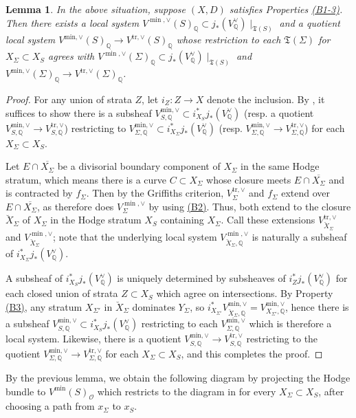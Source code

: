 \documentclass{amsart}
\newcommand{\customref}[2]{\hyperref[#1]{#2}}
\newtheorem{lem}[theorem]{Lemma}
\theoremstyle{definition}
\theoremstyle{remark}
\def\bQ{\mathbb{Q}}
\def\cO{\mathcal{O}}
\def\trans{\mathrm{tr}}
\numberwithin{equation}{section}
\begin{document}
\begin{lem}\label{lem:glueingalongHodge} In the above situation, suppose $(X,D)$ satisfies Properties \customref{b1}{(B1-3)}. Then there exists a local system $V^{\min,\vee}(S)_\bQ\subset j_*(V^\vee_\bQ)\mid_{\mathfrak{T}(S)}$ and a quotient local system $V^{\mathrm{min},\vee}(S)_\bQ\to V^{\trans,\vee}(S)_\bQ$ whose restriction to each $\mathfrak{T}(\Sigma)$ for $X_\Sigma\subset X_S$ agrees with $V^{\min,\vee}(\Sigma)_{\bQ}\subset j_*(V^\vee_\bQ)\mid_{\mathfrak{T}(S)}$ and $V^{\mathrm{min},\vee}(\Sigma)_\bQ\to V^{\trans,\vee}(\Sigma)_\bQ$.

\end{lem}

\begin{proof}For any union of strata $Z$, let $i_Z:Z\to X$ denote the inclusion.  By , it suffices to show there is a subsheaf $V_{S,\bQ}^{\mathrm{min},\vee}\subset i^*_{X_S}j_*(V_\bQ^\vee)$ (resp. a quotient $V_{S,\bQ}^{\mathrm{min},\vee}\to V_{S,\bQ}^{\trans,\vee}$) restricting to $V_{\Sigma,\bQ}^{\mathrm{min},\vee}\subset i^*_{X_\Sigma}j_*(V_\bQ^\vee)$ (resp. $V_{\Sigma,\bQ}^{\mathrm{min},\vee}\to V_{\Sigma,\bQ}^{\trans,\vee}$) for each $X_\Sigma\subset X_S$.  


Let $E\cap \overline{X_\Sigma}$ be a divisorial boundary component of $X_\Sigma$ in the same Hodge stratum, which means there is a curve $C\subset X_\Sigma$ whose closure meets $E\cap \overline{X_\Sigma}$ and is contracted by $f_\Sigma$. Then by the Griffiths criterion, $V_\Sigma^{\trans,\vee}$ and $f_\Sigma$ extend over $E\cap \overline{X_\Sigma}$, as therefore does $V_\Sigma^{\min,\vee}$ by  using \customref{b2}{(B2)}. Thus, both extend to the closure $\breve X_\Sigma$ of $X_\Sigma$ in the Hodge stratum $X_S$ containing $X_\Sigma$.  Call these extensions $ V^{\trans,\vee}_{\breve X_\Sigma}$ and $ V^{\min,\vee}_{\breve X_\Sigma}$; note that the underlying local system $ V^{\min,\vee}_{\breve X_\Sigma,\bQ}$ is naturally a subsheaf of $i^*_{X_\Sigma}j_*(V^\vee_\bQ)$.

A subsheaf of $i_{X_S}^*j_*(V^\vee_\bQ)$ is uniquely determined by subsheaves of $i_Z^*j_*(V^\vee_\bQ)$ for each closed union of strata $Z\subset X_S$ which agree on intersections.  By Property \customref{b3}{(B3)}, any stratum $X_{\Sigma'}$ in $\breve X_\Sigma$ dominates $Y_\Sigma$, so $i^*_{X_{\Sigma'}}V_{\breve X_\Sigma,\bQ}^{\mathrm{min},\vee}=V_{X_{\Sigma'},\bQ}^{\mathrm{min},\vee}$, hence there is a subsheaf $V_{S,\bQ}^{\mathrm{min},\vee}\subset i_{X_S}^*j_*(V^\vee_\bQ)$ restricting to each $V_{\Sigma,\bQ}^{\mathrm{min},\vee}$ which is therefore a local system.  Likewise, there is a quotient $V_{S,\bQ}^{\mathrm{min},\vee}\to V_{S,\bQ}^{\trans,\vee}$ restricting to the quotient $V_{\Sigma,\bQ}^{\mathrm{min},\vee}\to V_{\Sigma,\bQ}^{\trans,\vee}$ for each $X_\Sigma\subset X_S$, and this completes the proof.
\end{proof}
By the previous lemma, we obtain the following diagram by projecting the Hodge bundle to $V^\mathrm{min}(S)_\cO$ which restricts to the diagram in  for every $X_\Sigma\subset X_S$, after choosing a path from $x_\Sigma$ to $x_S$.
\end{document}
